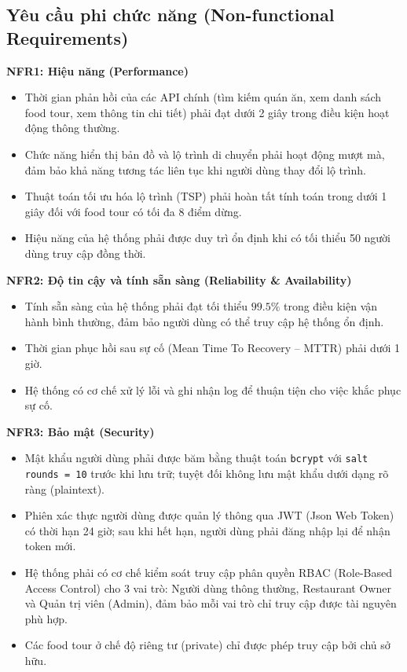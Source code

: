 \subsection{Yêu cầu phi chức năng (Non-functional Requirements)}

\textbf{NFR1: Hiệu năng (Performance)} 
\begin{itemize}[label=\textbullet]
    \item Thời gian phản hồi của các API chính (tìm kiếm quán ăn, xem danh sách food tour, xem
thông tin chi tiết) phải đạt dưới 2 giây trong điều kiện hoạt động thông thường.
    \item Chức năng hiển thị bản đồ và lộ trình di chuyển phải hoạt động mượt mà, đảm bảo khả năng
tương tác liên tục khi người dùng thay đổi lộ trình.
    \item Thuật toán tối ưu hóa lộ trình (TSP) phải hoàn tất tính toán trong dưới 1 giây đối với
food tour có tối đa 8 điểm dừng.
    \item Hiệu năng của hệ thống phải được duy trì ổn định khi có tối thiểu 50 người dùng truy cập
đồng thời.
\end{itemize}

\textbf{NFR2: Độ tin cậy và tính sẵn sàng (Reliability \& Availability)} 
\begin{itemize}[label=\textbullet]
    \item Tính sẵn sàng của hệ thống phải đạt tối thiểu $99.5\%$ trong điều kiện vận hành bình thường,
đảm bảo người dùng có thể truy cập hệ thống ổn định.
    \item Thời gian phục hồi sau sự cố (Mean Time To Recovery -- MTTR) phải dưới 1 giờ.
    \item Hệ thống có cơ chế xử lý lỗi và ghi nhận log để thuận tiện cho việc khắc phục sự cố.
\end{itemize}

\textbf{NFR3: Bảo mật (Security)} 
\begin{itemize}[label=\textbullet]
    \item Mật khẩu người dùng phải được băm bằng thuật toán \texttt{bcrypt} với \texttt{salt rounds = 10}
trước khi lưu trữ; tuyệt đối không lưu mật khẩu dưới dạng rõ ràng (plaintext).
    \item Phiên xác thực người dùng được quản lý thông qua JWT (Json Web Token) có thời hạn 24 giờ;
sau khi hết hạn, người dùng phải đăng nhập lại để nhận token mới.
    \item Hệ thống phải có cơ chế kiểm soát truy cập phân quyền RBAC (Role-Based Access Control)
cho 3 vai trò: Người dùng thông thường, Restaurant Owner và Quản trị viên (Admin), đảm bảo
mỗi vai trò chỉ truy cập được tài nguyên phù hợp.
    \item Các food tour ở chế độ riêng tư (private) chỉ được phép truy cập bởi chủ sở hữu.
\end{itemize}

